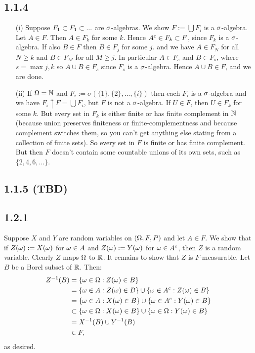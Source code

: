 \documentclass[11pt]{article}
\begin{document}
\subsection*{1.1.4}
 \begin{enumerate}
    \item[(i)] Suppose $F_1 \subset F_1 \subset ...$ are $\sigma$-algebras. We show $F := \bigcup F_i$ is a $\sigma$-algebra. Let $A \in F$. Then $A \in F_k$ for some $k$. Hence $A^c \in F_k \subset F$, since $F_k$ is a $\sigma$-algebra. If also $B \in F$ then $B \in F_j$ for some $j$. and we have $A \in F_N$ for all $N \geq k$ and $B \in F_M$ for all $M \geq j$. In particular $A \in F_s$ and $B \in F_s$, where $s = \max{j,k}$ so $A \cup B \in  F_s$ since $F_s$ is a $\sigma$-algebra. Hence $A \cup B \in F$, and we are done.
    \item[(ii)] If $\Omega = {\mathbb N}$ and $F_i := \sigma(\{1\},\{2\},...,\{i\})$ then each $F_i$ is a $\sigma$-algebra and we have $F_i\uparrow F=\bigcup F_i$, but $F$ is not a $\sigma$-algebra. If $U \in F$, then $U \in F_k$ for some $k$. But every set in $F_k$ is either finite or has finite complement in ${\mathbb N}$ (because union preserves finiteness or finite-complementness and because complement switches them, so you can't get anything else stating from a collection of finite sets). So every set in $F$ is finite or has finite complement. But then $F$ doesn't contain some countable unions of its own sets, such as $\{2,4,6,...\}$.
 \end{enumerate}

\subsection*{1.1.5 (TBD)}

\subsection*{1.2.1}

Suppose $X$ and $Y$ are random variables on $(\Omega,F, P)$ and let $A \in F$. We show that if $Z(\omega) := X(\omega)$ for $\omega \in A$ and $Z(\omega) := Y(\omega)$ for $\omega \in A^c$, then $Z$ is a random variable. Clearly $Z$ maps $\Omega$ to ${\mathbb R}$. It remains to show that $Z$ is $F$-measurable. Let $B$ be a Borel subset of ${\mathbb R}$. Then: \begin{align*}
    Z^{-1}(B) &= \{\omega \in \Omega : Z(\omega) \in B\} \\
    &= \{\omega \in A : Z(\omega) \in B\}\cup \{\omega \in A^c : Z(\omega) \in B\} \\
    &= \{\omega \in A : X(\omega) \in B\}\cup \{\omega \in A^c : Y(\omega) \in B\} \\
    &\subset \{\omega \in \Omega : X(\omega) \in B\}\cup \{\omega \in \Omega : Y(\omega) \in B\} \\
    &= X^{-1}(B) \cup Y^{-1}(B) \\
    & \in F,
\end{align*} as desired.
\end{document}
